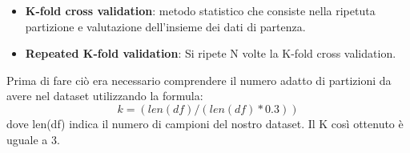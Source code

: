 \par{
\begin{itemize}
    \item \textbf{K-fold cross validation}: metodo statistico che consiste nella ripetuta partizione e valutazione dell’insieme dei dati di partenza. 
    \item \textbf{Repeated K-fold validation}: Si ripete N volte la K-fold cross validation.
\end{itemize}
}
Prima di fare ciò era necessario comprendere il numero adatto di partizioni da avere nel dataset utilizzando la formula:
\begin{equation}
    k= (len(df)/(len(df)*0.3))
\end{equation}
dove len(df) indica il numero di campioni del nostro dataset. Il K così ottenuto è uguale a 3.